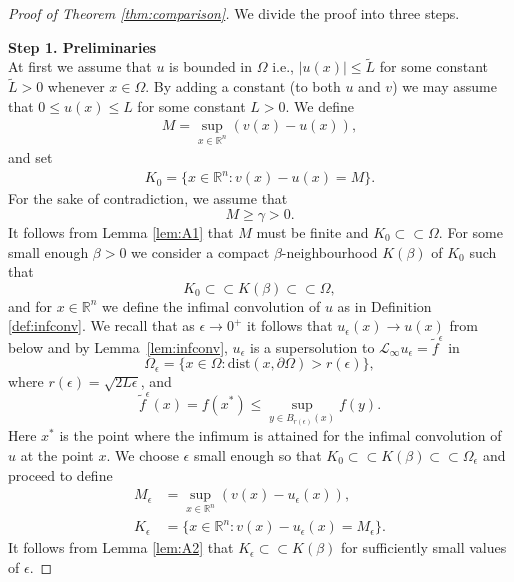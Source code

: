 \documentclass[10pt,a4paper]{amsart}
\providecommand{\Linf}{\mathcal{L}_{\infty}}
\providecommand{\Rn}{\mathbb{R}^n}
\newcommand{\dist}{\mathrm{dist}}
\newcommand{\wt}{\widetilde}
\begin{document}
\begin{proof}[Proof of Theorem \ref{thm:comparison}] We divide the proof into three steps.

\textbf{Step 1. Preliminaries} \\
At first we assume that $u$ is bounded in $\Omega$ i.e., $|u(x)| \leq \wt{L}$ for some constant $\wt{L} > 0$ whenever $x \in \Omega$. By adding a constant (to both $u$ and $v$) we may assume that $0\leq u(x)\leq L$ for some constant $L > 0$. We define
\begin{align*}
    M = \sup_{x \in \Rn} (v(x)-u(x)),
\end{align*}
and set
\begin{align*}
    K_0 = \{x \in \Rn:v(x)-u(x) = M \}.
\end{align*}
For the sake of contradiction, we assume that
\begin{equation}\label{eq:contradiction2}
    M \geq \gamma > 0.
\end{equation}
It follows from Lemma \ref{lem:A1} that $M$ must be finite and $K_0 \subset \subset \Omega$.
For some small enough $\beta>0$ we consider a compact $\beta$-neighbourhood $K(\beta)$ of $K_0$ such that
$$
K_0 \subset \subset K(\beta) \subset \subset \Omega,
$$
and for $x \in \Rn$ we define the infimal convolution of $u$ as in Definition \ref{def:infconv}. We recall that as $\epsilon \to 0^+$ it follows that $u_{\epsilon}(x) \to u(x)$ from below and by Lemma~\ref{lem:infconv}, $u_{\epsilon}$ is a supersolution to $\Linf u_{\epsilon} =  \tilde{f}^{\epsilon}$ in 
$$
\Omega_{\epsilon} = \{x \in \Omega:\dist(x, \partial \Omega) > r(\epsilon) \},
$$
where $r(\epsilon) = \sqrt{2L\epsilon}$, and 
$$
 \tilde{f}^{\epsilon}(x) =  f(x^*) \leq \sup_{y \in B_{r(\epsilon)}(x)} f(y).
$$
Here $x^*$ is the point where the infimum is attained for the infimal convolution of $u$ at the point $x$. We choose $\epsilon$ small enough so that $K_0 \subset \subset K(\beta) \subset \subset \Omega_{\epsilon}$ and proceed to define
\begin{align*}
    M_{\epsilon} &= \sup_{x \in \Rn}(v(x)-u_{\epsilon}(x)) , \\
    K_{\epsilon} &= \{x \in \Rn  :v(x)-u_{\epsilon}(x) = M_{\epsilon} \}.
\end{align*}
It follows from Lemma \ref{lem:A2} that $K_{\epsilon} \subset \subset K(\beta)$ for sufficiently small values of $\epsilon$.


\end{proof}
\end{document}
